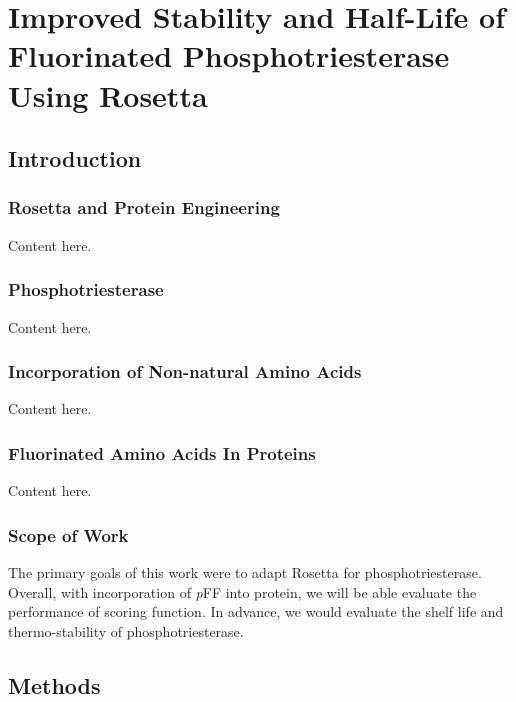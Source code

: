 \chapter{Improved Stability and Half-Life of Fluorinated Phosphotriesterase
Using Rosetta} 
\label{chap:rosetta}

\begin{refsection}

\section{Introduction}

\subsection{Rosetta and Protein Engineering}
\label{sec:rosetta}

Content here.

\subsection{Phosphotriesterase} 
\label{sec:pte}

Content here.

\subsection{Incorporation of Non-natural Amino Acids} \label{sec:rsi}

Content here.

\subsection{Fluorinated Amino Acids In Proteins} 
\label{sec:faa}

Content here.

\subsection{Scope of Work}

The primary goals of this work were to adapt Rosetta for phosphotriesterase.
Overall, with incorporation of \emph{p}FF into protein, we will be able
evaluate the performance of scoring function. In advance, we would evaluate the
shelf life and thermo-stability of phosphotriesterase.

\section{Methods}


\end{refsection}
